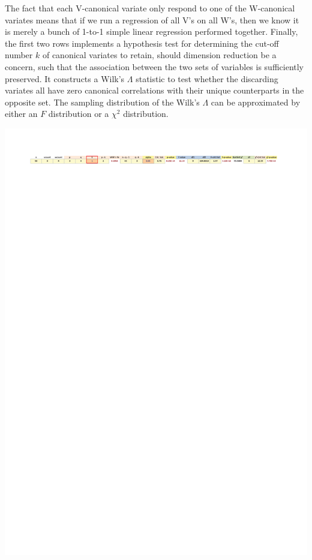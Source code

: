 \documentclass[article]{jss}
\numberwithin{equation}{subsection}
\begin{document}
        The fact that each V-canonical variate only respond to one of the W-canonical variates means that if we run a regression of all V's on all W's, then we know it is merely a bunch of 1-to-1 simple linear regression performed together.
        Finally, the first two rows implements a hypothesis test for determining the cut-off number $k$ of canonical variates to retain, should dimension reduction be a concern, such that the association between the two sets of variables is sufficiently preserved. It constructs a Wilk's $\Lambda$ statistic to test whether the discarding variates all have zero canonical correlations with their unique counterparts in the opposite set. The sampling distribution of the Wilk's $\Lambda$ can be approximated by either an $F$ distribution or a $\chi^2$ distribution.
        \begin{center}
          \vspace{-10pt}\includegraphics[width=\linewidth, keepaspectratio=true]{img/CanCorrSheetHypothesisTests_markup}
        \end{center}
        
\end{document}
